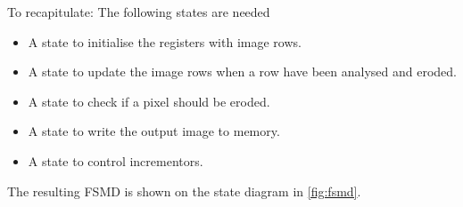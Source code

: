 \documentclass[a4paper, english]{article}
\numberwithin{equation}{section}
\begin{document}
\begin{figure}[H]
\begin{subfigure}[t]{.3\textwidth}
{
        }%
    \end{subfigure}
\end{figure}\newpage
To recapitulate: The following states are needed
\begin{itemize}
    \item A state to initialise the registers with image rows.
    \item A state to update the image rows when a row have been analysed and eroded.
    \item A state to check if a pixel should be eroded.
    \item A state to write the output image to memory.
    \item A state to control incrementors.
\end{itemize}
The resulting FSMD is shown on the state diagram in \cref{fig:fsmd}.
\end{document}
